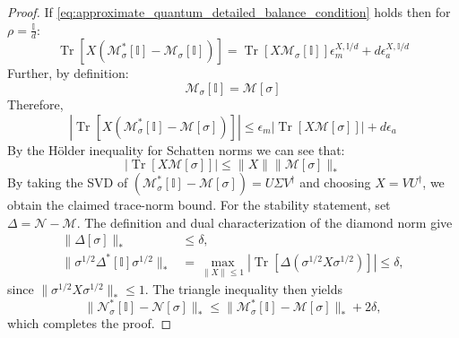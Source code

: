\documentclass[aps,floatfix,10pt,amssymb,amsfont,amsmath,superscriptaddress,float,nofootinbib,longbibliography,nobalancelastpage,twocolumn]{revtex4-2}
\begin{document}
\begin{proof}
    If \eqref{eq:approximate_quantum_detailed_balance_condition} holds then for $\rho = \frac{\mathbb{I}}{d}$:
    \begin{equation}
        \operatorname{Tr}\left[X (\mathcal{M}^*_{\sigma}[\mathbb{I}]-\mathcal{M}_{\sigma}[\mathbb{I}])\right] = \operatorname{Tr}\left[X\mathcal{M}_{\sigma}[\mathbb{I}]\right]\epsilon^{X,\mathbb{I}/d}_m + d\epsilon^{X,\mathbb{I}/d}_a
    \end{equation}
    Further, by definition:
    \begin{equation}
        \mathcal{M}_{\sigma}[\mathbb{I}] = \mathcal{M}[\sigma]
    \end{equation}
    Therefore,
    \begin{equation}
    \label{eq:lhs}
        \left|\operatorname{Tr}\left[X
        (\mathcal{M}^*_{\sigma}[\mathbb{I}]-\mathcal{M}[\sigma])\right]\right|
        \leq \epsilon_m\left|\operatorname{Tr}\left[X\mathcal{M}[\sigma]\right]\right|
        +d\epsilon_a
    \end{equation}
    By the H\"older inequality for Schatten norms we can see that: 
        \begin{equation}
        |\operatorname{Tr}[X\mathcal{M}[\sigma]]| \leq \|X\|\|\mathcal{M}[\sigma]\|_*
    \end{equation}
    By taking the SVD of $(\mathcal{M}^*_{\sigma}[\mathbb{I}]-\mathcal{M}[\sigma]) = U\Sigma V^{\dagger}$ and choosing $X = VU^{\dagger}$, we obtain the claimed trace-norm bound. For the stability statement, set $\Delta=\mathcal{N}-\mathcal{M}$. The definition and dual characterization of the diamond norm give
    \begin{align*}
        \|\Delta[\sigma]\|_* &\leq \delta,\\
        \|\sigma^{1/2}\Delta^*[\mathbb{I}]\sigma^{1/2}\|_*
        &=\max_{\|X\|\leq1}\left|\operatorname{Tr}\left[\Delta(\sigma^{1/2}X\sigma^{1/2})\right]\right|\leq\delta,
    \end{align*}
    since $\|\sigma^{1/2}X\sigma^{1/2}\|_*\leq1$. The triangle inequality then yields
    \begin{equation}
        \|\mathcal{N}^*_{\sigma}[\mathbb{I}]-\mathcal{N}[\sigma]\|_*
        \leq \|\mathcal{M}^*_{\sigma}[\mathbb{I}]-\mathcal{M}[\sigma]\|_*+2\delta,
    \end{equation}
    which completes the proof.
\end{proof}
\end{document}
